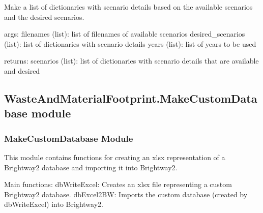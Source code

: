 \documentclass[letterpaper,10pt,english]{sphinxmanual}
\begin{document}
\begin{fulllineitems}
\label{\detokenize{WasteAndMaterialFootprint:WasteAndMaterialFootprint.FutureScenarios.make_possible_scenario_list}}
\pysigstartsignatures
{}
\pysigstopsignatures
\sphinxAtStartPar
Make a list of dictionaries with scenario details based on the available scenarios and the desired scenarios.

\sphinxAtStartPar
args: filenames (list): list of filenames of available scenarios
desired\_scenarios (list): list of dictionaries with scenario details
years (list): list of years to be used

\sphinxAtStartPar
returns: scenarios (list): list of dictionaries with scenario details that are available and desired

\end{fulllineitems}



\subsection{WasteAndMaterialFootprint.MakeCustomDatabase module}
\label{\detokenize{WasteAndMaterialFootprint:module-WasteAndMaterialFootprint.MakeCustomDatabase}}\label{\detokenize{WasteAndMaterialFootprint:wasteandmaterialfootprint-makecustomdatabase-module}}

\subsubsection{MakeCustomDatabase Module}
\label{\detokenize{WasteAndMaterialFootprint:makecustomdatabase-module}}
\sphinxAtStartPar
This module contains functions for creating an xlsx representation of a Brightway2 database 
and importing it into Brightway2.

\sphinxAtStartPar
Main functions:
\sphinxhyphen{} dbWriteExcel: Creates an xlsx file representing a custom Brightway2 database.
\sphinxhyphen{} dbExcel2BW: Imports the custom database (created by dbWriteExcel) into Brightway2.
\end{document}
